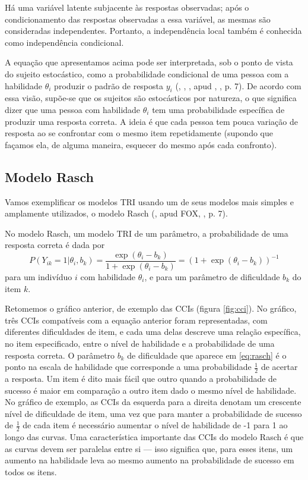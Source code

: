\documentclass[
	12pt,				%
	openright,			%
	twoside,			%
	a4paper,			%
	english,			%
	brazil				%
	]{abntex2}
\begin{document}
 Há uma variável latente subjacente às respostas observadas; após o condicionamento das respostas observadas a essa variável, as mesmas são consideradas independentes. Portanto, a independência local também é conhecida como independência condicional.
 
 A equação que apresentamos acima pode ser interpretada, sob o ponto de vista do sujeito estocástico, como a probabilidade condicional de uma pessoa com a habilidade $\theta_{i}$ produzir o padrão de resposta $y_{i}$ (, \citeyear{holland1990}, , \citeyear{molenaar1995} apud , \citeyear{fox2010}, p. 7). De acordo com essa visão, supõe-se que os sujeitos são estocásticos por natureza, o que significa dizer que uma pessoa com habilidade $\theta_{i}$ tem uma probabilidade específica de produzir uma resposta correta. A ideia é que cada pessoa tem pouca variação de resposta ao se confrontar com o mesmo item repetidamente (supondo que façamos ela, de alguma maneira, esquecer do mesmo após cada confronto).
 
 \subsection{Modelo Rasch}
 Vamos exemplificar os modelos TRI usando um de seus modelos mais simples e amplamente utilizados, o modelo Rasch (\citeyear{rasch1960}, apud FOX, \citeyear{fox2010}, p. 7).

 No modelo Rasch, um modelo TRI de um parâmetro, a probabilidade de uma resposta correta é dada por
 \begin{equation}
    P(Y_{ik} = 1| \theta_{i}, b_{k}) = \frac{\exp{(\theta_{i} - b_{k})}}{1+\exp{(\theta_{i} - b_{k})}} = (1 + \exp{(\theta_{i} - b_{k})})^{-1} \label{eq:rasch}
  \end{equation}
 para um indivíduo $i$ com habilidade $\theta_{i}$, e para um parâmetro de dificuldade $b_{k}$ do item $k$.
 
 Retomemos o gráfico anterior, de exemplo das CCIs (figura \ref{fig:cci}). No gráfico, três CCIs compatíveis com a equação anterior foram representadas, com diferentes dificuldades de item, e cada uma delas descreve uma relação específica, no item especificado, entre o nível de habilidade e a probabilidade de uma resposta correta. O parâmetro $b_{k}$ de dificuldade que aparece em \eqref{eq:rasch} é o ponto na escala de habilidade que corresponde a uma probabilidade $\frac{1}{2}$ de acertar a resposta. Um item é dito mais fácil que outro quando a probabilidade de sucesso é maior em comparação a outro item dado o mesmo nível de habilidade. No gráfico de exemplo, as CCIs da esquerda para a direita denotam um crescente nível de dificuldade de item, uma vez que para manter a probabilidade de sucesso de $\frac{1}{2}$ de cada item é necessário aumentar o nível de habilidade de -1 para 1 ao longo das curvas. Uma característica importante das CCIs do modelo Rasch é que as curvas devem ser paralelas entre si --- isso significa que, para esses itens, um aumento na habilidade leva ao mesmo aumento na probabilidade de sucesso em todos os itens.
 
\end{document}

